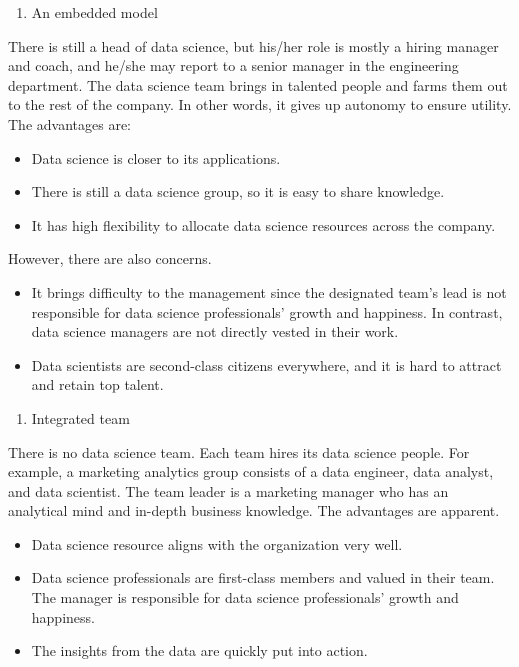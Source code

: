 \documentclass[
  12pt,
]{krantz}
\providecommand{\tightlist}{%
  \setlength{\itemsep}{0pt}\setlength{\parskip}{0pt}}
\begin{document}
\begin{enumerate}
\def\labelenumi{(\arabic{enumi})}
\setcounter{enumi}{1}
\tightlist
\item
  An embedded model
\end{enumerate}

There is still a head of data science, but his/her role is mostly a hiring manager and coach, and he/she may report to a senior manager in the engineering department. The data science team brings in talented people and farms them out to the rest of the company. In other words, it gives up autonomy to ensure utility. The advantages are:

\begin{itemize}
\tightlist
\item
  Data science is closer to its applications.
\item
  There is still a data science group, so it is easy to share knowledge.
\item
  It has high flexibility to allocate data science resources across the company.
\end{itemize}

However, there are also concerns.

\begin{itemize}
\tightlist
\item
  It brings difficulty to the management since the designated team's lead is not responsible for data science professionals' growth and happiness. In contrast, data science managers are not directly vested in their work.
\item
  Data scientists are second-class citizens everywhere, and it is hard to attract and retain top talent.
\end{itemize}

\begin{enumerate}
\def\labelenumi{(\arabic{enumi})}
\setcounter{enumi}{2}
\tightlist
\item
  Integrated team
\end{enumerate}

There is no data science team. Each team hires its data science people. For example, a marketing analytics group consists of a data engineer, data analyst, and data scientist. The team leader is a marketing manager who has an analytical mind and in-depth business knowledge. The advantages are apparent.

\begin{itemize}
\tightlist
\item
  Data science resource aligns with the organization very well.
\item
  Data science professionals are first-class members and valued in their team. The manager is responsible for data science professionals' growth and happiness.
\item
  The insights from the data are quickly put into action.
\end{itemize}
\end{document}
